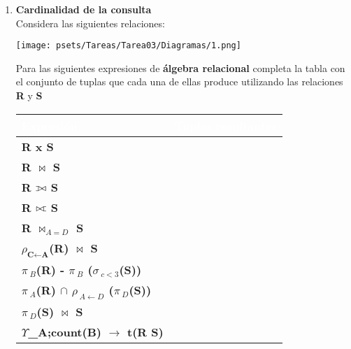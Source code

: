 \documentclass[10pt,letterpaper,fleqn]{article}
\def\ojoin{\setbox0=\hbox{$\bowtie$}%
  \rule[-.02ex]{.25em}{.4pt}\llap{\rule[\ht0]{.25em}{.4pt}}}
\def\leftouterjoin{\mathbin{\ojoin\mkern-5.8mu\bowtie}}
\def\rightouterjoin{\mathbin{\bowtie\mkern-5.8mu\ojoin}}
\def\fullouterjoin{\mathbin{\ojoin\mkern-5.8mu\bowtie\mkern-5.8mu\ojoin}}
\begin{document}
    \begin{enumerate}
        \item \textbf{Cardinalidad de la consulta}\\
        Considera las siguientes relaciones:
        \begin{center}
            \texttt{[image: psets/Tareas/Tarea03/Diagramas/1.png]}
        \end{center}
        Para las siguientes expresiones de \textbf{álgebra relacional} completa la tabla con el conjunto de tuplas que cada una de ellas produce utilizando las relaciones \textbf{R} y  \textbf{S}
        \begin{center}
            \begin{tabular}{|l|l|}
            \hline
            \cellcolor{black}\textcolor{white}{Expresión} & \cellcolor{black}\textcolor{white}{Tuplas resultantes}\\
            \hline
            \cellcolor{gray}\textbf{R x S} & \cellcolor{gray}\\
            \hline 
            \textbf{R $\bowtie$ S} & \\
            \hline
            \cellcolor{gray}\textbf{R $\leftouterjoin$ S} & \cellcolor{gray}\\
            \hline
            \textbf{R $\rightouterjoin$ S} & \\
            \hline
            \cellcolor{gray}\textbf{R $\bowtie_{A=D}$ S} & \cellcolor{gray}\\
            \hline
            \textbf{$\rho_{\textbf{C}\xleftarrow{}\textbf{A}}$(R) $\bowtie$ S} & \\
            \hline
             \cellcolor{gray}\textbf{$\pi_{\:B}$(R) - $\pi_{\:B}$ ($\sigma_{\: c < 3}$(S))} &  \cellcolor{gray}\\
            \hline

             \textbf{$\pi_{\:A}$(R) $\cap$ $\rho_{\:A \leftarrow D }$ ($\pi_{\:D}$(S))} & \\
            \hline
            
            \cellcolor{gray}\textbf{$\pi_{\:D}$(S) $\bowtie$ S} &  \cellcolor{gray}\\
            \hline
            
            \textbf{$\Upsilon$_{\:A;count(B) $\rightarrow$ t}(R \fullouterjoin S)} & \\
            \hline
            

\end{tabular}
\end{center}
\end{enumerate}
\end{document}
